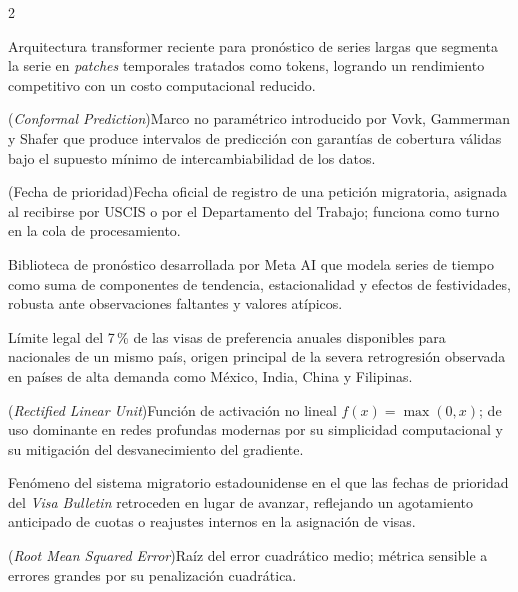 \documentclass[12pt,letterpaper]{report}
\begin{document}
\begin{multicols}{2}
\begin{description}[leftmargin=0pt, labelindent=0pt, itemindent=0pt,
                    labelsep=0.4em, font=\bfseries\scriptsize,
                    itemsep=2pt, parsep=0pt, topsep=0pt]
    \item[PatchTST] Arquitectura transformer reciente para pronóstico de series largas que segmenta la serie en \textit{patches} temporales tratados como tokens, logrando un rendimiento competitivo con un costo computacional reducido.

    \item[Predicción conforme] (\textit{Conformal Prediction})\hspace{0.3em}Marco no paramétrico introducido por Vovk, Gammerman y Shafer que produce intervalos de predicción con garantías de cobertura válidas bajo el supuesto mínimo de intercambiabilidad de los datos.

    \item[Priority Date] (Fecha de prioridad)\hspace{0.3em}Fecha oficial de registro de una petición migratoria, asignada al recibirse por USCIS o por el Departamento del Trabajo; funciona como turno en la cola de procesamiento.

    \item[Prophet] Biblioteca de pronóstico desarrollada por Meta AI que modela series de tiempo como suma de componentes de tendencia, estacionalidad y efectos de festividades, robusta ante observaciones faltantes y valores atípicos.

    \item[Per-country limit] Límite legal del 7\,\% de las visas de preferencia anuales disponibles para nacionales de un mismo país, origen principal de la severa retrogresión observada en países de alta demanda como México, India, China y Filipinas.

    \item[ReLU] (\textit{Rectified Linear Unit})\hspace{0.3em}Función de activación no lineal $f(x) = \max(0, x)$; de uso dominante en redes profundas modernas por su simplicidad computacional y su mitigación del desvanecimiento del gradiente.

    \item[Retrogresión] Fenómeno del sistema migratorio estadounidense en el que las fechas de prioridad del \textit{Visa Bulletin} retroceden en lugar de avanzar, reflejando un agotamiento anticipado de cuotas o reajustes internos en la asignación de visas.

    \item[RMSE] (\textit{Root Mean Squared Error})\hspace{0.3em}Raíz del error cuadrático medio; métrica sensible a errores grandes por su penalización cuadrática.


\end{description}
\end{multicols}
\end{document}
